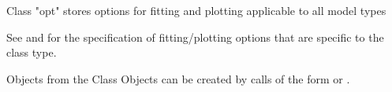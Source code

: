 \documentclass{article}
\begin{document}
\begin{Description}\relax
Class "opt" stores options for fitting and plotting applicable to
all model types
\end{Description}
\begin{Details}\relax
See  and   for 
the specification of fitting/plotting options that are specific to the 
class type.
\end{Details}
\begin{Section}{Objects from the Class}
Objects can be created by calls of the form  or
.
\end{Section}
\end{document}

